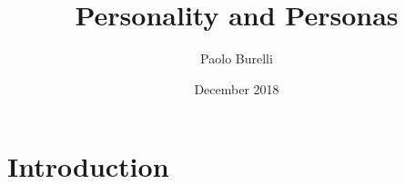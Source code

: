 \documentclass{article}
\title{Personality and Personas}
\author{Paolo Burelli}
\date{December 2018}
\begin{document}
\maketitle

\section{Introduction}
\end{document}
